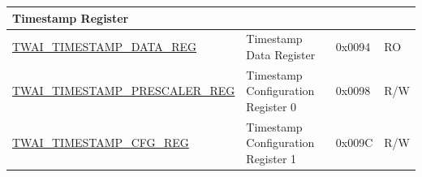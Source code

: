 \begin{longtable}{ | p{6cm} | p{6.2cm} | p{1.3cm} | p{1.5cm} | }
\multicolumn{4}{|l|}{\textbf{Timestamp Register}} \\ \hline
\hyperref[regdesc:TWAITIMESTAMPDATAREG]{TWAI\_TIMESTAMP\_DATA\_REG} & Timestamp Data Register & 0x0094 & RO \\ \hline
\hyperref[regdesc:TWAITIMESTAMPPRESCALERREG]{TWAI\_TIMESTAMP\_PRESCALER\_REG} & Timestamp Configuration Register 0 & 0x0098 & R/W \\ \hline
\hyperref[regdesc:TWAITIMESTAMPCFGREG]{TWAI\_TIMESTAMP\_CFG\_REG} & Timestamp Configuration Register 1 & 0x009C & R/W \\ \hline
\end{longtable}
